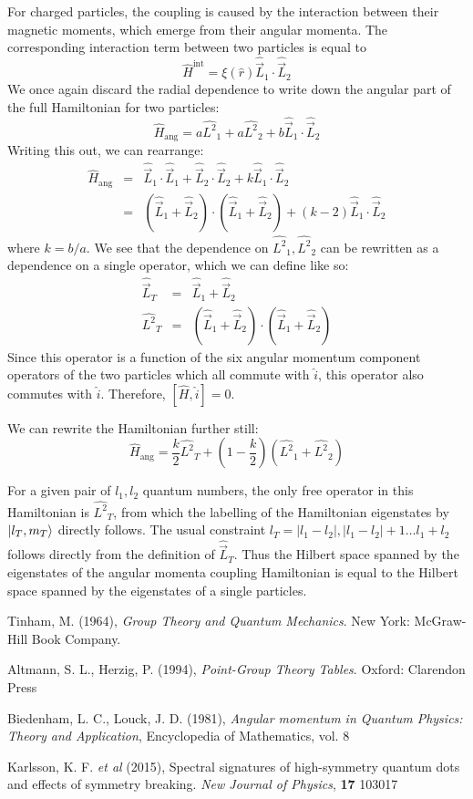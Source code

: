 \documentclass[12pt]{article}
\begin{document}
	For charged particles, the coupling is caused by the interaction between their magnetic moments, which emerge from their angular momenta. The corresponding interaction term between two particles is equal to
	$$\hat{H}^{\text{int}}=\xi(\hat{r})\hat{\vec{L}}_1\cdot\hat{\vec{L}}_2$$
	We once again discard the radial dependence to write down the angular part of the full Hamiltonian for two particles:
	$$\hat{H}_{\text{ang}}=a\hat{L^2}_1+a\hat{L^2}_2+b\hat{\vec{L}}_1\cdot\hat{\vec{L}}_2$$
	Writing this out, we can rearrange:
	\begin{eqnarray*}
	\hat{H}_{\text{ang}}&=&\hat{\vec{L}}_1\cdot\hat{\vec{L}}_1+\hat{\vec{L}}_2\cdot\hat{\vec{L}}_2+k\hat{\vec{L}}_1\cdot\hat{\vec{L}}_2\\
	&=&\left(\hat{\vec{L}}_1+\hat{\vec{L}}_2\right)\cdot\left(\hat{\vec{L}}_1+\hat{\vec{L}}_2\right)+(k-2)\hat{\vec{L}}_1\cdot\hat{\vec{L}}_2
	\end{eqnarray*}
	where $k=b/a$. We see that the dependence on $\hat{L^2}_1,\hat{L^2}_2$ can be rewritten as a dependence on a single operator, which we can define like so:
	\begin{eqnarray*}
	\hat{\vec{L}}_T&=&\hat{\vec{L}}_1+\hat{\vec{L}}_2\\
	\hat{L^2}_T&=&\left(\hat{\vec{L}}_1+\hat{\vec{L}}_2\right)\cdot\left(\hat{\vec{L}}_1+\hat{\vec{L}}_2\right)
	\end{eqnarray*}
	Since this operator is a function of the six angular momentum component operators of the two particles which all commute with $\hat{i}$, this operator also commutes with $\hat{i}$. Therefore, $[\hat{H},\hat{i}]=0$.
	
	We can rewrite the Hamiltonian further still:
	$$\hat{H}_{\text{ang}}=\frac{k}{2}\hat{L^2}_T+\left(1-\frac{k}{2}\right)\left(\hat{L^2}_1+\hat{L^2}_2\right)$$
	
	For a given pair of $l_1, l_2$ quantum numbers, the only free operator in this Hamiltonian is $\hat{L^2}_T$, from which the labelling of the Hamiltonian eigenstates by $\ket{l_T, m_T}$ directly follows. The usual constraint $l_T=|l_1-l_2|, |l_1-l_2|+1\dots l_1+l_2$ follows directly from the definition of $\hat{\vec{L}}_T$. Thus the Hilbert space spanned by the eigenstates of the angular momenta coupling Hamiltonian is equal to the Hilbert space spanned by the eigenstates of a single particles.
	
\begin{thebibliography}{10}

Tinham, M. (1964), \textit{Group Theory and Quantum Mechanics}. New York: McGraw-Hill Book Company.

Altmann, S. L., Herzig, P. (1994), \textit{Point-Group Theory Tables}. Oxford: Clarendon Press

Biedenham, L. C., Louck, J. D. (1981), \textit{Angular momentum in Quantum Physics: Theory and Application}, Encyclopedia of Mathematics, vol. 8

Karlsson, K. F. \textit{et al} (2015), Spectral signatures of high-symmetry quantum dots and effects of symmetry breaking. \textit{New Journal of Physics}, \textbf{17} 103017


\end{thebibliography}	
	
\end{document}
